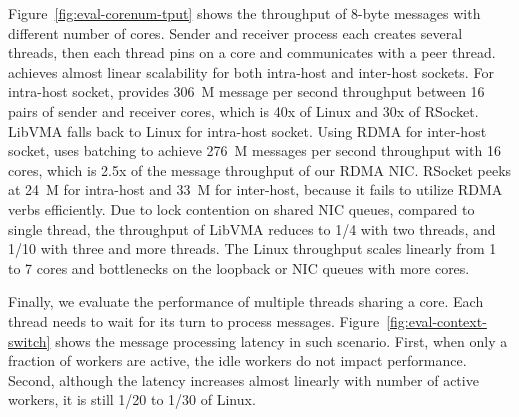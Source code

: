 Figure~\ref{fig:eval-corenum-tput} shows the throughput of 8-byte messages with different number of cores.
Sender and receiver process each creates several threads, then each thread pins on a core and communicates with a peer thread.
\sys achieves almost linear scalability for both intra-host and inter-host sockets.
For intra-host socket, \sys provides 306~M message per second throughput between 16 pairs of sender and receiver cores, which is 40x of Linux and 30x of RSocket.
LibVMA falls back to Linux for intra-host socket.
Using RDMA for inter-host socket, \sys uses batching to achieve 276~M messages per second throughput with 16 cores, which is 2.5x of the message throughput of our RDMA NIC.
RSocket peeks at 24~M for intra-host and 33~M for inter-host, because it fails to utilize RDMA verbs efficiently.
Due to lock contention on shared NIC queues, compared to single thread, the throughput of LibVMA reduces to 1/4 with two threads, and 1/10 with three and more threads.
The Linux throughput scales linearly from 1 to 7 cores and bottlenecks on the loopback or NIC queues with more cores.



Finally, we evaluate the performance of multiple threads sharing a core. Each thread needs to wait for its turn to process messages.
Figure~\ref{fig:eval-context-switch} shows the message processing latency in such scenario.
First, when only a fraction of workers are active, the idle workers do not impact performance. 
Second, although the latency increases almost linearly with number of active workers, it is still 1/20 to 1/30 of Linux.



